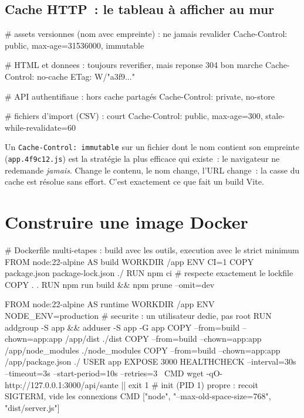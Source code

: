\subsection{Cache HTTP~: le tableau \`a afficher au mur}

\begin{codeconf}
# assets versionnes (nom avec empreinte) : ne jamais revalider
Cache-Control: public, max-age=31536000, immutable

# HTML et donnees : toujours reverifier, mais reponse 304 bon marche
Cache-Control: no-cache
ETag: W/"a3f9..."

# API authentifiaue : hors cache partag\'es
Cache-Control: private, no-store

# fichiers d'import (CSV) : court
Cache-Control: public, max-age=300, stale-while-revalidate=60
\end{codeconf}

\begin{note}
Un \verb|Cache-Control: immutable| sur un fichier dont le nom contient son empreinte
(\verb|app.4f9c12.js|) est la strat\'egie la plus efficace qui existe~: le navigateur ne redemande
\emph{jamais}. Change le contenu, le nom change, l'URL change~: la casse du cache est r\'esolue
sans effort. C'est exactement ce que fait un build Vite.
\end{note}

\section{Construire une image Docker}

\begin{codeconf}
# Dockerfile multi-etapes : build avec les outils, execution avec le strict minimum
FROM node:22-alpine AS build
WORKDIR /app
ENV CI=1
COPY package.json package-lock.json ./
RUN npm ci                       # respecte exactement le lockfile
COPY . .
RUN npm run build && npm prune --omit=dev

FROM node:22-alpine AS runtime
WORKDIR /app
ENV NODE_ENV=production
# securite : un utilisateur dedie, pas root
RUN addgroup -S app && adduser -S app -G app
COPY --from=build --chown=app:app /app/dist ./dist
COPY --from=build --chown=app:app /app/node_modules ./node_modules
COPY --from=build --chown=app:app /app/package.json ./
USER app
EXPOSE 3000
HEALTHCHECK --interval=30s --timeout=3s --start-period=10s --retries=3 \
  CMD wget -qO- http://127.0.0.1:3000/api/sante || exit 1
# init (PID 1) propre : recoit SIGTERM, vide les connexions
CMD ["node", "--max-old-space-size=768", "dist/server.js"]
\end{codeconf}

